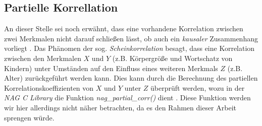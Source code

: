 \subsection{Partielle Korrellation}
\label{sec:part_korr}

An dieser Stelle sei noch erwähnt, dass eine vorhandene Korrelation zwischen zwei Merkmalen nicht darauf schließen lässt, ob auch ein {\it kausaler} Zusammenhang vorliegt \cite[S. 148]{Fahrmeir2010}. Das Phänomen der sog. {\it Scheinkorrelation} besagt, dass eine Korrelation zwischen den Merkmalen $X$ und $Y$ (z.B. Körpergröße und Wortschatz von Kindern) unter Umständen auf den Einfluss eines weiteren Merkmals $Z$ (z.B. Alter) zurückgeführt werden kann. Dies kann durch die Berechnung des partiellen Korrelationskoeffizienten von $X$ und $Y$ unter $Z$ überprüft werden, wozu in der {\it NAG C Library} die Funktion {\it nag\_partial\_corr()} dient \cite[S. 1]{nag:g02byc}. Diese Funktion werden wir hier allerdings nicht näher betrachten, da es den Rahmen dieser Arbeit sprengen würde.